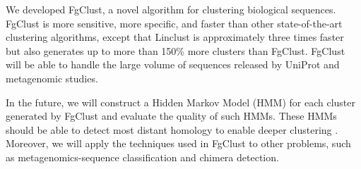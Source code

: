 \documentclass{bioinfo}
\begin{document}
We developed FgClust, a novel algorithm for clustering biological sequences.
FgClust is more sensitive, more specific, and faster than other state-of-the-art clustering algorithms, except that Linclust is approximately three times faster but also generates up to more than 150\% more clusters than FgClust.
%
FgClust will be able to handle the large volume of sequences released by UniProt and metagenomic studies.

In the future, we will construct a Hidden Markov Model (HMM) for each cluster generated by FgClust and evaluate the quality of such HMMs. These HMMs should be able to detect most distant homology to enable deeper clustering \citep{steinegger2017mmseqs2}.
Moreover, we will apply the techniques used in FgClust to other problems, such as metagenomics-sequence classification and chimera detection.%
\end{document}
